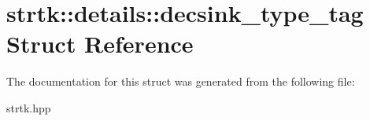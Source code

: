 \hypertarget{structstrtk_1_1details_1_1decsink__type__tag}{\section{strtk\-:\-:details\-:\-:decsink\-\_\-type\-\_\-tag Struct Reference}
\label{structstrtk_1_1details_1_1decsink__type__tag}
}


The documentation for this struct was generated from the following file\-:\begin{DoxyCompactItemize}
\item 
strtk.\-hpp\end{DoxyCompactItemize}
